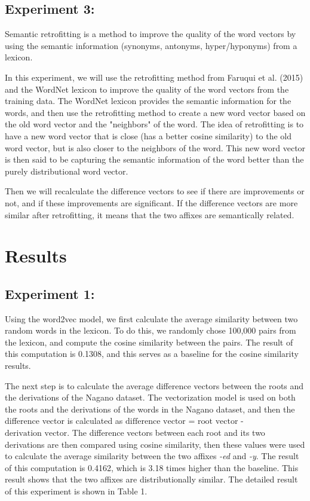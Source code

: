 \documentclass[12pt]{article}
\begin{document}
\subsection{Experiment 3:}
    Semantic retrofitting is a method to improve the quality of the word vectors by using the semantic information (synonyms, antonyms, hyper/hyponyms) from a lexicon. 

    In this experiment, we will use the retrofitting method from Faruqui et al. (2015) and the WordNet lexicon to improve the quality of the word vectors from the training data. The WordNet lexicon provides the semantic information for the words, and then use the retrofitting method to create a new word vector based on the old word vector and the "neighbors" of the word. The idea of retrofitting is to have a new word vector that is close (has a better cosine similarity) to the old word vector, but is also closer to the neighbors of the word. This new word vector is then said to be capturing the semantic information of the word better than the purely distributional word vector.

    Then we will recalculate the difference vectors to see if there are improvements or not, and if these improvements are significant. If the difference vectors are more similar after retrofitting, it means that the two affixes are semantically related.

\section{Results}
    \subsection{Experiment 1:}
    Using the word2vec model, we first calculate the average similarity between two random words in the lexicon. To do this, we randomly chose 100,000 pairs from the lexicon, and compute the cosine similarity between the pairs. The result of this computation is 0.1308, and this serves as a baseline for the cosine similarity results. 

    The next step is to calculate the average difference vectors between the roots and the derivations of the Nagano dataset. The vectorization model is used on both the roots and the derivations of the words in the Nagano dataset, and then the difference vector is calculated as $\text{difference vector}$ = $\text{root vector}$ - $\text{derivation vector}$. The difference vectors between each root and its two derivations are then compared using cosine similarity, then these values were used to calculate the average similarity between the two affixes \emph{-ed} and \emph{-y}. The result of this computation is 0.4162, which is 3.18 times higher than the baseline. This result shows that the two affixes are distributionally similar. The detailed result of this experiment is shown in Table 1.
\end{document}
